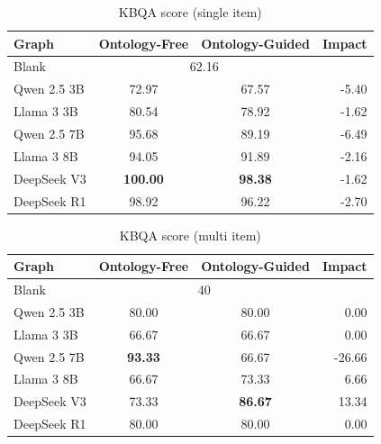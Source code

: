 \documentclass[a4, conference]{IEEEtran}
\begin{document}
\begin{table}[h]
    \centering
    \caption{KBQA score (single item)}
    \label{tab:qa_percent_single}
    \begin{tabular}{|l|c|c|r|}
        \hline
        Graph       & Ontology-Free               & Ontology-Guided & Impact \\
        \hline
        Blank       & \multicolumn{2}{|c|}{62.16} &                          \\
        \hline
        Qwen 2.5 3B & 72.97                       & 67.57           & -5.40  \\
        \hline
        Llama 3 3B  & 80.54                       & 78.92           & -1.62  \\
        \hline
        Qwen 2.5 7B & 95.68                       & 89.19           & -6.49  \\
        \hline
        Llama 3 8B  & 94.05                       & 91.89           & -2.16  \\
        \hline
        DeepSeek V3 & \textbf{100.00}             & \textbf{98.38}  & -1.62  \\
        \hline
        DeepSeek R1 & 98.92                       & 96.22           & -2.70  \\
        \hline
    \end{tabular}
\end{table}

\begin{table}[h]
    \centering
    \caption{KBQA score (multi item)}
    \label{tab:qa_percent_multi}
    \begin{tabular}{|l|c|c|r|}
        \hline
        Graph       & Ontology-Free            & Ontology-Guided & Impact \\
        \hline
        Blank       & \multicolumn{2}{|c|}{40} &                          \\
        \hline
        Qwen 2.5 3B & 80.00                    & 80.00           & 0.00   \\
        \hline
        Llama 3 3B  & 66.67                    & 66.67           & 0.00   \\
        \hline
        Qwen 2.5 7B & \textbf{93.33}           & 66.67           & -26.66 \\
        \hline
        Llama 3 8B  & 66.67                    & 73.33           & 6.66   \\
        \hline
        DeepSeek V3 & 73.33                    & \textbf{86.67}  & 13.34  \\
        \hline
        DeepSeek R1 & 80.00                    & 80.00           & 0.00   \\
        \hline
    \end{tabular}
\end{table}
\end{document}
